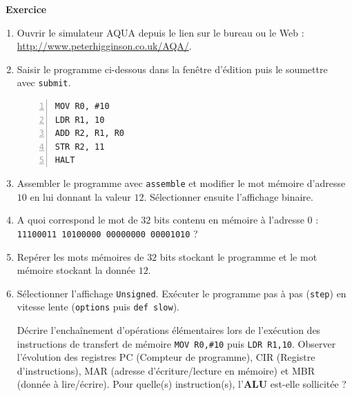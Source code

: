 \documentclass[a4paper, french, 11pt]{article}  %
\newcounter{def}
\newcounter{exercice}
\newenvironment{exercice}[1]
{\par \medskip   \addtocounter{exercice}{1} \noindent  
\begin{bclogo}[arrondi =0.1,   noborder = true, logo=\bccrayon, marge=4]{~\textbf{Exercice} \textbf{\theexercice} {\itshape #1} }  \par}
{
\end{bclogo}
 \par \bigskip }
\newcounter{prog}
\begin{document}
\begin{exercice}{}


\begin{enumerate}
	\item Ouvrir le simulateur AQUA depuis le lien sur le bureau ou le Web : \url{http://www.peterhigginson.co.uk/AQA/}.
	
	\item Saisir le programme ci-dessous dans la fenêtre d'édition puis le soumettre avec \texttt{submit}.
	
\begin{lstlisting}[numbers=left]
MOV R0, #10
LDR R1, 10
ADD R2, R1, R0
STR R2, 11
HALT
\end{lstlisting}

\item Assembler le programme avec \texttt{assemble} et modifier le mot mémoire d'adresse $10$ en lui donnant la valeur $12$. Sélectionner ensuite l'affichage binaire.

\item A quoi correspond le mot de $32$ bits contenu en mémoire à l'adresse $0$ : \texttt{11100011 10100000 00000000 00001010} ?

\item  Repérer les  mots mémoires de $32$ bits stockant le programme et le mot mémoire stockant la donnée $12$.

\item Sélectionner l'affichage \texttt{Unsigned}. Exécuter le programme pas à pas (\texttt{step})  en vitesse lente (\texttt{options} puis \texttt{def slow}).

Décrire l'enchaînement d'opérations élémentaires lors de l'exécution des instructions de transfert de mémoire \texttt{MOV R0,\#10} puis \texttt{LDR R1,10}. Observer l'évolution des registres PC (Compteur de programme), CIR (Registre d'instructions), MAR (adresse d'écriture/lecture en mémoire) et MBR (donnée à lire/écrire). Pour quelle(s) instruction(s), l'\textbf{ALU} est-elle sollicitée ?
     



\end{enumerate}

\end{exercice}
\end{document}
